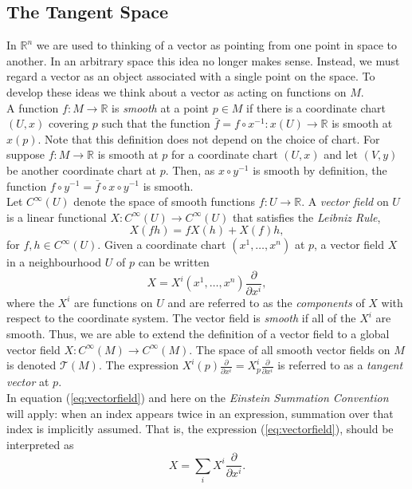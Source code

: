 \subsection{The Tangent Space}\label{sec:tangentspace}
In $\mathbb{R}^n$ we are used to thinking of a vector as pointing from one point
in space to another. In an arbitrary space this idea no longer makes sense.
Instead, we must regard a vector as an object associated with a single point on
the space. To develop these ideas we think about a vector as acting on functions
on $M$.\\

A function $f:M\rightarrow\mathbb{R}$ is \textit{smooth} at a point $p\in M$ if
there is a coordinate chart $(U,x)$ covering $p$ such that the function
$\bar{f}=f\circ x^{-1}:x(U)\rightarrow \mathbb{R}$ is smooth at $x(p)$. Note
that this definition does not depend on the choice of chart. For suppose
$f:M\rightarrow\mathbb{R}$ is smooth at $p$ for a coordinate chart $(U,x)$ and
let $(V,y)$ be another coordinate chart at $p$. Then, as $x\circ y^{-1}$ is
smooth by definition, the function $f\circ y^{-1}=\bar{f}\circ x \circ y^{-1}$
is smooth.\\

Let $C^{\infty}(U)$ denote the space of smooth functions $f:U\rightarrow
\mathbb{R}$. A \textit{vector field} on $U$ is a linear functional
$X:C^{\infty}(U)\rightarrow C^{\infty}(U)$ that satisfies the \textit{Leibniz
Rule},
\[X(fh)=f X(h) + X(f)h, \]
for $f,h\in C^{\infty}(U)$. Given a coordinate chart
$(x^1,\dots,x^n)$ at $p$, a vector field $X$ in a neighbourhood $U$ of $p$ can
be written
 \begin{equation} 
 X= X^i(x^1,\dots,x^n) \frac{\partial}{\partial x^i},
\label{eq:vectorfield}
\end{equation}
where the $X^i$ are functions on $U$ and are referred to as the
\textit{components} of $X$ with respect to the coordinate system. The vector
field is \textit{smooth} if all of the $X^i$ are smooth. Thus, we are able to
extend the definition of a vector field to a global vector field
$X:C^{\infty}(M)\rightarrow C^{\infty}(M)$. The space of all smooth vector
fields on $M$ is denoted $\mathcal{T}(M)$. The expression $X^i(p)
\frac{\partial}{\partial x^i}=X^i_p \frac{\partial}{\partial x^i}$ is referred
to as a \textit{tangent vector} at $p$.\\

In equation (\ref{eq:vectorfield}) and here on the
\textit{Einstein Summation Convention} will apply: when an index appears twice
in an expression, summation over that index is implicitly assumed. That is, the
expression (\ref{eq:vectorfield}), should be interpreted as
\[  X= \sum_i X^i \frac{\partial}{\partial x^i}. \]

